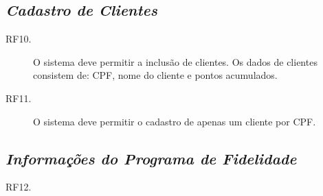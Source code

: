 \documentclass[article, 12pt, oneside, a4paper, brazil]{abntex2}
\begin{document}
 \subsection*{\emph{Cadastro de Clientes}}
 \begin{description}
  \item [RF10.] O sistema deve permitir a inclusão de clientes. Os dados de clientes consistem de: CPF, nome do cliente e pontos acumulados.
  \item [RF11.] O sistema deve permitir o cadastro de apenas um cliente por CPF.
 \end{description}
 
 \subsection*{\emph{Informações do Programa de Fidelidade}}
 \begin{description}
  \item [RF12.] 
 \end{description}




 
\end{document}
